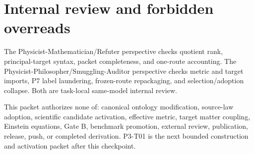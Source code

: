 \documentclass[11pt]{article}
\begin{document}
\section{Internal review and forbidden overreads}

The Physicist-Mathematician/Refuter perspective checks quotient rank,
principal-target syntax, packet completeness, and one-route accounting. The
Physicist-Philosopher/Smuggling-Auditor perspective checks metric and target
imports, P7 label laundering, frozen-route repackaging, and selection/adoption
collapse. Both are task-local same-model internal review.

This packet authorizes none of: canonical ontology modification, source-law
adoption, scientific candidate activation, effective metric, target matter
coupling, Einstein equations, Gate B, benchmark promotion, external review,
publication, release, push, or completed derivation. P3-T01 is the next bounded
construction and activation packet after this checkpoint.
\end{document}
